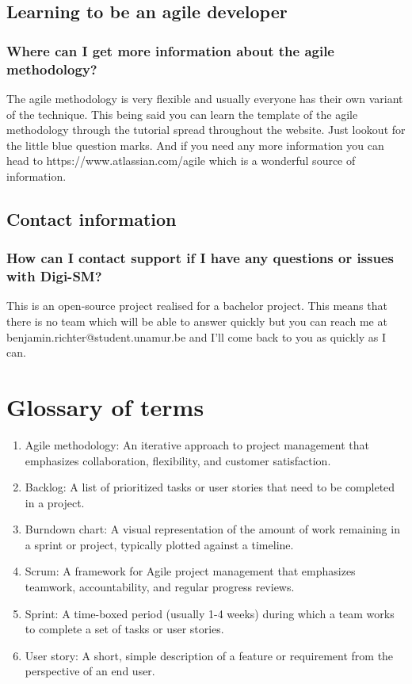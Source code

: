 \documentclass{article}
\begin{document}
\subsection{Learning to be an agile developer}

\subsubsection{Where can I get more information about the agile methodology?}

The agile methodology is very flexible and usually everyone has their own variant of the technique. This being said you can learn the template of the agile methodology through the tutorial spread throughout the website. Just lookout for the little blue question marks.
And if you need any more information you can head to https://www.atlassian.com/agile which is a wonderful source of information.

\subsection{Contact information}
\label{sec:ContactInfo}

\subsubsection{How can I contact support if I have any questions or issues with Digi-SM?
}

This is an open-source project realised for a bachelor project. This means that there is no team which will be able to answer quickly but you can reach me at benjamin.richter@student.unamur.be and I'll come back to you as quickly as I can.

\newpage

\section{Glossary of terms}

\begin{enumerate}
\item Agile methodology: An iterative approach to project management that emphasizes collaboration, flexibility, and customer satisfaction.
\item Backlog: A list of prioritized tasks or user stories that need to be completed in a project.
\item Burndown chart: A visual representation of the amount of work remaining in a sprint or project, typically plotted against a timeline.
\item Scrum: A framework for Agile project management that emphasizes teamwork, accountability, and regular progress reviews.
\item Sprint: A time-boxed period (usually 1-4 weeks) during which a team works to complete a set of tasks or user stories.
\item User story: A short, simple description of a feature or requirement from the perspective of an end user.
\end{enumerate}
\end{document}
